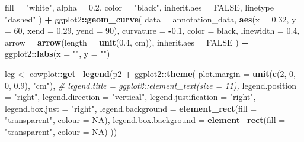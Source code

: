 \documentclass[
]{book}
\newenvironment{Shaded}{\begin{snugshade}}{\end{snugshade}}
\newcommand{\AttributeTok}[1]{\textcolor[rgb]{0.13,0.29,0.53}{#1}}
\newcommand{\CommentTok}[1]{\textcolor[rgb]{0.56,0.35,0.01}{\textit{#1}}}
\newcommand{\ConstantTok}[1]{\textcolor[rgb]{0.56,0.35,0.01}{#1}}
\newcommand{\DecValTok}[1]{\textcolor[rgb]{0.00,0.00,0.81}{#1}}
\newcommand{\FloatTok}[1]{\textcolor[rgb]{0.00,0.00,0.81}{#1}}
\newcommand{\FunctionTok}[1]{\textcolor[rgb]{0.13,0.29,0.53}{\textbf{#1}}}
\newcommand{\NormalTok}[1]{#1}
\newcommand{\OtherTok}[1]{\textcolor[rgb]{0.56,0.35,0.01}{#1}}
\newcommand{\SpecialCharTok}[1]{\textcolor[rgb]{0.81,0.36,0.00}{\textbf{#1}}}
\newcommand{\StringTok}[1]{\textcolor[rgb]{0.31,0.60,0.02}{#1}}
\begin{document}
\begin{Shaded}
\begin{Highlighting}[]
    \AttributeTok{fill =} \StringTok{"white"}\NormalTok{,}
    \AttributeTok{alpha =} \FloatTok{0.2}\NormalTok{,}
    \AttributeTok{color =} \StringTok{"black"}\NormalTok{,}
    \AttributeTok{inherit.aes =} \ConstantTok{FALSE}\NormalTok{,}
    \AttributeTok{linetype =} \StringTok{"dashed"}
\NormalTok{  ) }\SpecialCharTok{+}
\NormalTok{  ggplot2}\SpecialCharTok{::}\FunctionTok{geom\_curve}\NormalTok{(}
    \AttributeTok{data =}\NormalTok{ annotation\_data,}
    \FunctionTok{aes}\NormalTok{(}\AttributeTok{x =} \FloatTok{0.32}\NormalTok{, }\AttributeTok{y =} \DecValTok{60}\NormalTok{, }\AttributeTok{xend =} \FloatTok{0.29}\NormalTok{, }\AttributeTok{yend =} \DecValTok{90}\NormalTok{),}
    \AttributeTok{curvature =} \SpecialCharTok{{-}}\FloatTok{0.1}\NormalTok{,}
    \AttributeTok{color =} \StringTok{\textquotesingle{}black\textquotesingle{}}\NormalTok{,}
    \AttributeTok{linewidth =} \FloatTok{0.4}\NormalTok{,}
    \AttributeTok{arrow =} \FunctionTok{arrow}\NormalTok{(}\AttributeTok{length =} \FunctionTok{unit}\NormalTok{(}\FloatTok{0.4}\NormalTok{, }\StringTok{\textquotesingle{}cm\textquotesingle{}}\NormalTok{)),}
    \AttributeTok{inherit.aes =} \ConstantTok{FALSE}
\NormalTok{  ) }\SpecialCharTok{+}
\NormalTok{  ggplot2}\SpecialCharTok{::}\FunctionTok{labs}\NormalTok{(}\AttributeTok{x =} \StringTok{""}\NormalTok{, }\AttributeTok{y =} \StringTok{""}\NormalTok{)}


\NormalTok{leg }\OtherTok{\textless{}{-}}\NormalTok{ cowplot}\SpecialCharTok{::}\FunctionTok{get\_legend}\NormalTok{(p2 }\SpecialCharTok{+}
\NormalTok{                             ggplot2}\SpecialCharTok{::}\FunctionTok{theme}\NormalTok{(}
                               \AttributeTok{plot.margin =} \FunctionTok{unit}\NormalTok{(}\FunctionTok{c}\NormalTok{(}\DecValTok{2}\NormalTok{, }\DecValTok{0}\NormalTok{, }\DecValTok{0}\NormalTok{, }\FloatTok{0.9}\NormalTok{), }\StringTok{"cm"}\NormalTok{),}
                               \CommentTok{\# legend.title = ggplot2::element\_text(size = 11),}
                               \AttributeTok{legend.position =} \StringTok{"right"}\NormalTok{,}
                               \AttributeTok{legend.direction =} \StringTok{"vertical"}\NormalTok{,}
                               \AttributeTok{legend.justification =} \StringTok{"right"}\NormalTok{,}
                               \AttributeTok{legend.box.just =} \StringTok{"right"}\NormalTok{,}
                               \AttributeTok{legend.background =} \FunctionTok{element\_rect}\NormalTok{(}\AttributeTok{fill =} \StringTok{"transparent"}\NormalTok{, }\AttributeTok{colour =} \ConstantTok{NA}\NormalTok{),}
                               \AttributeTok{legend.box.background =} \FunctionTok{element\_rect}\NormalTok{(}\AttributeTok{fill =} \StringTok{"transparent"}\NormalTok{, }\AttributeTok{colour =} \ConstantTok{NA}\NormalTok{)}
\NormalTok{                             ))}


\end{Highlighting}
\end{Shaded}
\end{document}
